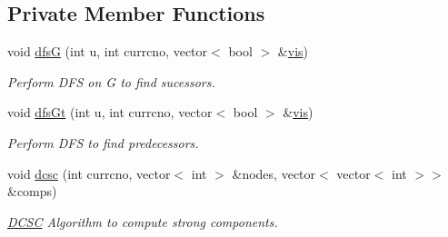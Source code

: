 \subsection*{Private Member Functions}
\begin{DoxyCompactItemize}
\item 
void \mbox{\hyperlink{classDCSC_a262b1be4dc9bf0da1b9d2d938b7f9c1b}{dfsG}} (int u, int currcno, vector$<$ bool $>$ \&\mbox{\hyperlink{classDCSC_a5bdcee3f90e24a2742b10be94dc42502}{vis}})
\begin{DoxyCompactList}\small\item\em Perform D\+FS on G to find sucessors. \end{DoxyCompactList}\item 
void \mbox{\hyperlink{classDCSC_aa58c4ad1ac9efb2b7b5b97ef8c0e25ac}{dfs\+Gt}} (int u, int currcno, vector$<$ bool $>$ \&\mbox{\hyperlink{classDCSC_a5bdcee3f90e24a2742b10be94dc42502}{vis}})
\begin{DoxyCompactList}\small\item\em Perform D\+FS to find predecessors. \end{DoxyCompactList}\item 
void \mbox{\hyperlink{classDCSC_af9ebb39c172ff579794d33bc1d8f67d2}{dcsc}} (int currcno, vector$<$ int $>$ \&nodes, vector$<$ vector$<$ int $>$$>$ \&comps)
\begin{DoxyCompactList}\small\item\em \mbox{\hyperlink{classDCSC}{D\+C\+SC}} Algorithm to compute strong components. \end{DoxyCompactList}\end{DoxyCompactItemize}
